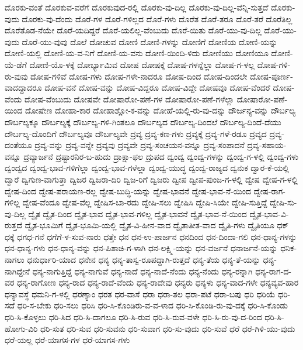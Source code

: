 ದೊರಕು-ವಂತೆ
ದೊರಕುವ-ವರೆಗೆ
ದೊರಕುವುದ-ರಲ್ಲಿ
ದೊರಕು-ವು-ದಿಲ್ಲ
ದೊರಕು-ವು-ದಿಲ್ಲ-ವೆನ್ನಿ-ಸುತ್ತದೆ
ದೊರಕು-ವುದು
ದೊರಕು-ವು-ದೆಂದು
ದೊರೆ-ಗಳ
ದೊರೆ-ಗಳಿಲ್ಲದ
ದೊರೆ-ಗಳು
ದೊರೆತ
ದೊರೆ-ತರೂ
ದೊರೆ-ತರೆ
ದೊರೆತಿಲ್ಲ
ದೊರೆತೊಡ-ನೆಯೇ
ದೊರೆ-ಯದಿದ್ದರೆ
ದೊರೆ-ಯಲಿಲ್ಲ-ವೆಂಬುದು
ದೊರೆ-ಯಿತು
ದೊರೆ-ಯು-ವು-ದಿಲ್ಲ
ದೊರೆ-ಯು-ವುದು
ದೊರೆ-ಯು-ವುವು
ದೊಲೆ
ದೋಚುವ
ದೋಣಿ
ದೋಣಿ-ಗಳನ್ನು
ದೋಣಿಗೆ
ದೋಣಿಯ
ದೋಣಿ-ಯನ್ನು
ದೋಣಿ-ಯಲ್ಲಿ
ದೋಣಿ-ಯ-ವ-ನಿಗೆ
ದೋಣಿ-ಯ-ವನು
ದೋಣಿ-ಯಿಂದಿ-ಳಿದು
ದೋಣಿಯು
ದೋಣಿಯೂ
ದೋಣಿ-ಯೆ-ಡೆಗೆ
ದೋಣಿ-ಯೊ-ಳಕ್ಕೆ
ದೋರ್ಭ್ಯಾಮಿವ
ದೋಷ
ದೋಷಕ್ಕೆ
ದೋಷ-ಗಳನ್ನೆಲ್ಲಾ
ದೋಷ-ಗ-ಳಲ್ಲ
ದೋಷ-ಗಳಿ-ರು-ವುವು
ದೋಷ-ಗಳಿವೆ
ದೋಷ-ಗಳು
ದೋಷ-ಗಳೇ-ನಾದರೂ
ದೋಷ-ದಿಂದ
ದೋಷ-ದಿಂದಲೇ
ದೋಷ-ಪೂರ್ಣ-ವಾದದ್ದಾದರೂ
ದೋಷ-ವನೆ
ದೋಷ-ವನ್ನು
ದೋಷ-ವಿದ್ದರೂ
ದೋಷ-ವಿದ್ದೇ
ದೋಷವೂ
ದೋಷ-ವೆಂದರೆ
ದೋಷ-ವೆಂದು
ದೋಷ-ವೆಂಬುದು
ದೋಷವೇ
ದೋಷಾರೋ-ಪಣೆ-ಗಳ
ದೋಷಾರೋ-ಪಣೆ-ಗಳೆಲ್ಲಾ
ದೋಷಾರೋ-ಪಣೆ-ಯಿಂದ
ದೋಷೇಣ
ದೋಹಾ-ಕಾರ
ದೋಹಾಶ್ಲೋ-ಕ-ವನ್ನು
ದೋಹೆ-ಯಲ್ಲಿ-ರು-ವು-ದನ್ನು
ದೌರ್ಜನ್ಯ-ವನ್ನು
ದೌರ್ಬಲ್ಯ
ದೌರ್ಬಲ್ಯಕ್ಕೂ
ದೌರ್ಬಲ್ಯಕ್ಕೆ
ದೌರ್ಬಲ್ಯ-ಗಳಿ-ಗಿಂತಲೂ
ದೌರ್ಬಲ್ಯದ
ದೌರ್ಬಲ್ಯ-ದಿಂದಲೆ
ದೌರ್ಬಲ್ಯ-ದಿಂದೆ-ದೆಯು
ದೌರ್ಬಲ್ಯ-ದೊಂದಿಗೆ
ದೌರ್ಬಲ್ಯವೂ
ದೌರ್ಬಲ್ಯವೇ
ದ್ರವ್ಯ
ದ್ರವ್ಯ-ಕಣ-ಗಳು
ದ್ರವ್ಯಕ್ಕೆ
ದ್ರವ್ಯ-ಗಳೆ-ರಡೂ
ದ್ರವ್ಯದ
ದ್ರವ್ಯ-ದಂತೆಯೂ
ದ್ರವ್ಯ-ವನ್ನು
ದ್ರವ್ಯ-ವನ್ನೇ
ದ್ರವ್ಯವು
ದ್ರವ್ಯವೇ
ದ್ರವ್ಯ-ಸಂಚಯನ-ವನ್ನೂ
ದ್ರವ್ಯ-ಸಂಪಾದನೆ
ದ್ರವ್ಯ-ಸಹಾಯ-ವನ್ನೂ
ದ್ರವ್ಯಾರ್ಜನೆ
ದ್ರಷ್ಟಾರನಿರ-ಬ-ಹುದು
ದ್ರಾಕ್ಷಾ-ಫಲ
ದ್ರುಪದ
ದ್ವಂದ್ವ
ದ್ವಂದ್ವ-ಗಳನ್ನು
ದ್ವಂದ್ವ-ಗ-ಳಲ್ಲಿ
ದ್ವಂದ್ವ-ಗಳು
ದ್ವಂದ್ವದ
ದ್ವಂದ್ವ-ಭಾವ-ಗಳಿಗೆಲ್ಲಾ
ದ್ವಂದ್ವ-ಭಾವ-ಗಳೆಲ್ಲಾ
ದ್ವಂದ್ವ-ಯುದ್ಧ
ದ್ವಂದ್ವ-ರಾಜ್ಯದ
ದ್ವನುಕ
ದ್ವಾರ-ಕೆ-ಯಲ್ಲಿ
ದ್ವಾರೆ
ದ್ವಿಗುಣ-ವಾಗುತ್ತಾ
ದ್ವಿಜರ
ದ್ವಿಜರಾ-ದಿರಿ
ದ್ವಿಜ-ರಿಗೆ
ದ್ವಿಜರು
ದ್ವೀಪ
ದ್ವೀಪ-ಪುಂಜ-ಗ-ಳಲ್ಲಿ
ದ್ವೇಷ
ದ್ವೇಷ-ಗ-ಳಲ್ಲಿ
ದ್ವೇಷ-ದಿಂದ
ದ್ವೇಷ-ಪರಾಯಣ-ರಲ್ಲ
ದ್ವೇಷ-ಬುದ್ಧಿ-ಯನ್ನು
ದ್ವೇಷ-ಭಾವನೆ
ದ್ವೇಷ-ಭಾವ-ನೆ-ಯಿಂದ
ದ್ವೇಷ-ರಾಗ-ಗಳಿಲ್ಲ
ದ್ವೇಷ-ವೆಂದೂ
ದ್ವೇಷ-ವೆಲ್ಲ
ದ್ವೇಷಿಸ-ಬಾ-ರದು
ದ್ವೇಷಿ-ಸಲು
ದ್ವೇಷಿಸಿ
ದ್ವೇಷಿ-ಸಿಯೇ
ದ್ವೇಷಿ-ಸುತ್ತಿದ್ದೆ
ದ್ವೇಷಿ-ಸು-ವು-ದಿಲ್ಲ
ದ್ವೈತ
ದ್ವೈತ-ದಿಂದ
ದ್ವೈತ-ಭಾವ
ದ್ವೈತ-ಭಾವ-ಗಳಿಲ್ಲ
ದ್ವೈತ-ಭಾವನೆ
ದ್ವೈತ-ಭಾವ-ನೆ-ಯಿಂದ
ದ್ವೈತ-ಭಾವ-ವಿ-ರುತ್ತದೆ
ದ್ವೈತ-ಭೂಮಿಗೆ
ದ್ವೈತ-ಭೂಮಿ-ಯಲ್ಲಿ
ದ್ವೈತ-ವಿ-ಹೀನ-ವಾದ
ದ್ವೈತಾತೀತ-ವಾದ
ದ್ವೈತಿ-ಗಳು
ದ್ವೈತಿಯೂ
ಧಕ್
ಧಕ್ಕೆ
ಧಗಧ-ಗನೆ
ಧಗೆಗೆ-ಳ-ಸುವ-ನಾರು
ಧತ್ತೇ
ಧನ
ಧನ-ಉ-ಪಾರ್ಜನ
ಧನದಿಂದ
ಧನ-ದಿಂದಾ-ಗಲಿ
ಧನ-ಧಾನ್ಯ-ಗಳನ್ನು
ಧನ-ಧಾನ್ಯ-ಗಳು
ಧನ-ಧಾನ್ಯ-ವನ್ನು
ಧನ-ಪಿಶಾಚಿ-ಗ-ಳಾಗಿ
ಧನ-ಲಕ್ಷ್ಮಿ-ಯನ್ನು
ಧನ-ವರ್ಜನೆ
ಧನಾರ್ಜನೆ-ಯನ್ನು
ಧನಿಕ-ನಾಗಲು
ಧನುರ್ಧಾರಿ-ಯಾದ
ಧನೇನ
ಧನ್ಯ
ಧನ್ಯ-ತಾಸ್ವ-ರೂಪದ್ದಾಗಿ-ರುತ್ತದೆ
ಧನ್ಯ-ತೆಯ
ಧನ್ಯ-ತೆ-ಯನ್ನು
ಧನ್ಯ-ನಾಗಿದ್ದೇನೆ
ಧನ್ಯ-ನಾಗುತ್ತಿದ್ದೆ
ಧನ್ಯ-ನಾಗುವೆ
ಧನ್ಯ-ನಾದೆ
ಧನ್ಯ-ನಾದೆ-ನೆಂದು
ಧನ್ಯ-ನೆಂದು
ಧನ್ಯ-ರನ್ನಾಗಿ
ಧನ್ಯ-ರಾಗ-ದ-ವರ
ಧನ್ಯ-ರಾಗೋಣ
ಧನ್ಯ-ರಾದ
ಧನ್ಯ-ರಾದೆ-ವೆಂದು
ಧನ್ಯ-ರಾದೇವು
ಧನ್ಯರು
ಧನ್ಯಳು
ಧನ್ಯ-ವಾದ-ಗಳೇ
ಧನ್ಯವ್ಯವ-ಹಾರ
ಧನ್ಯಾವಸ್ಥೆ
ಧಮನಿ-ಗ-ಳಲ್ಲಿ
ಧರಣ್ಯಾಂ
ಧರತ
ಧರ-ವಾಸೆ
ಧರಾ
ಧರಾ-ತಲ
ಧರಾ-ಪಟೆ
ಧರಾ-ಬಪು
ಧರಿ
ಧರಿಯೆ
ಧರಿ-ಸದೆ
ಧರಿ-ಸ-ಬೇಕು
ಧರಿ-ಸಲು
ಧರಿಸಿ
ಧರಿ-ಸಿ-ಕೊಂಡಿರು-ವ-ವ-ಳಾದ
ಧರಿ-ಸಿ-ಕೊಂಡಿ-ರು-ವು-ದಕ್ಕೆ
ಧರಿ-ಸಿ-ಕೊಂಡು
ಧರಿ-ಸಿ-ಕೊಳ್ಳಲು
ಧರಿ-ಸಿದ
ಧರಿ-ಸಿ-ದಾಗಲೂ
ಧರಿ-ಸಿ-ರುವ
ಧರಿ-ಸಿ-ರುವ-ವಳೇ
ಧರಿ-ಸಿ-ರು-ವು-ದ-ರಿಂದ
ಧರಿ-ಸಿ-ಹೋಗು-ವಿರಿ
ಧರಿ-ಸುತ
ಧರಿ-ಸುವ
ಧರಿ-ಸುವನು
ಧರಿ-ಸುವಾಗ
ಧರಿ-ಸು-ವುದು
ಧರಿ-ಸುವೆ
ಧರೆ
ಧರೆ-ಗಿಳಿ-ಯು-ವುದು
ಧರೆ-ಯಲ್ಲ
ಧರೆ-ಯಾಗಸ-ಗಳ
ಧರೆ-ಯಾಗಸ-ಗಳು
